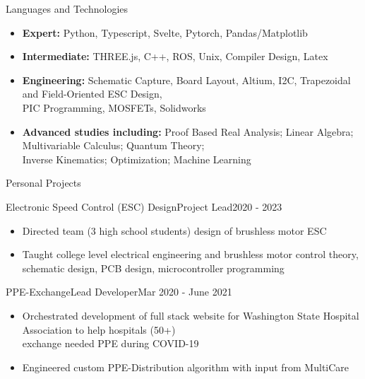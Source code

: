 \documentclass[]{mcdowellcv}
\begin{document}
\begin{cvsection}{Languages and Technologies}
	\begin{cvsubsection}{}{}{}
		\begin{itemize}
			\item \textbf{Expert:} Python, Typescript, Svelte, Pytorch, Pandas/Matplotlib
			\item \textbf{Intermediate:} THREE.js, C++, ROS, Unix, Compiler Design, Latex
			\item \textbf{Engineering:} Schematic Capture, Board Layout, Altium, I2C,
			      Trapezoidal and Field-Oriented ESC Design, \\ PIC Programming, MOSFETs, Solidworks
			\item \textbf{Advanced studies including:} Proof Based Real Analysis; Linear Algebra; Multivariable Calculus; Quantum Theory; \\ Inverse Kinematics; Optimization; Machine Learning
		\end{itemize}
	\end{cvsubsection}
\end{cvsection}

\begin{cvsection}{Personal Projects}
	\begin{cvsubsection}{Electronic Speed Control (ESC) Design}{Project Lead}{2020 - 2023}
		\begin{itemize}
			\item Directed team (3 high school students) design of brushless motor ESC
			\item Taught college level electrical engineering and brushless motor control theory, schematic design, PCB design, microcontroller programming
		\end{itemize}
	\end{cvsubsection}
	\begin{cvsubsection}{PPE-Exchange}{Lead Developer}{Mar 2020 - June 2021}
		\begin{itemize}
			\item Orchestrated development of full stack website for Washington State Hospital Association to help hospitals (50+) \\ exchange needed PPE during COVID-19
			\item Engineered custom PPE-Distribution algorithm with input from MultiCare
		\end{itemize}
	\end{cvsubsection}
\end{cvsection}
\end{document}
